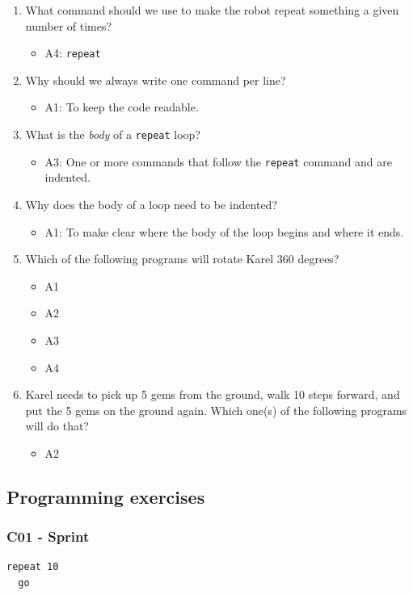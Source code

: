 \documentclass[article,A4,12pt]{llncs}
\begin{document}
\begin{enumerate}
\item What command should we use to make the robot repeat something a given number of times?
  \begin{itemize}
    \item A4: {\tt repeat}
  \end{itemize}
\item Why should we always write one command per line?
  \begin{itemize}
    \item A1: To keep the code readable.
  \end{itemize}
\item What is the {\em body} of a {\tt repeat} loop?
  \begin{itemize}
    \item A3: One or more commands that follow the {\tt repeat} command and are indented.
  \end{itemize}
\item Why does the body of a loop need to be indented?
  \begin{itemize}
    \item A1: To make clear where the body of the loop begins and where it ends.
  \end{itemize}
\item Which of the following programs will rotate Karel 360 degrees?
  \begin{itemize}
    \item A1
    \item A2
    \item A3
    \item A4
  \end{itemize}
\item Karel needs to pick up 5 gems from the ground, walk 10 steps forward, and put the 5 gems 
      on the ground again. Which one(s) of the following programs will do that?
  \begin{itemize}
    \item A2
  \end{itemize}
\end{enumerate}

\subsection{Programming exercises}

\subsubsection{C01 - Sprint}
\begin{verbatim}
repeat 10
  go
\end{verbatim}
\end{document}
